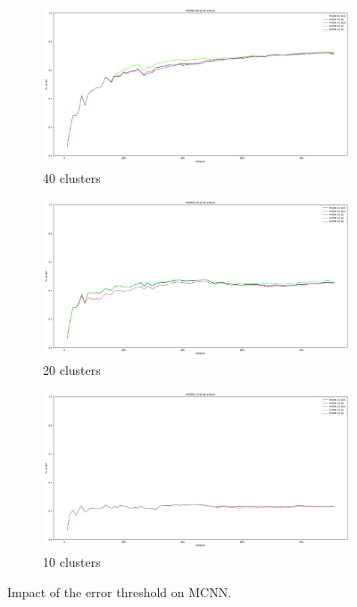 \begin{figure}[H]
	 \begin{subfigure}[b]{0.49\textwidth}
		 \centering
		 \includegraphics[width=\linewidth]{figures/Banos_S1_shuf_MCNN_40_error_check.png}
		 \caption{40 clusters}
	 \end{subfigure}
	 \begin{subfigure}[b]{0.49\textwidth}
		 \centering
		 \includegraphics[width=\linewidth]{figures/Banos_S1_shuf_MCNN_20_error_check.png}
		 \caption{20 clusters}
	 \end{subfigure}
	 \begin{subfigure}[b]{0.49\textwidth}
		 \centering
		 \includegraphics[width=\linewidth]{figures/Banos_S1_shuf_MCNN_10_error_check.png}
		 \caption{10 clusters}
	 \end{subfigure}
	\caption{Impact of the error threshold on MCNN.}
	\label{fig:mcnn-tuning-error}
\end{figure}

